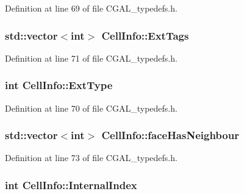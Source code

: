 Definition at line 69 of file C\+G\+A\+L\+\_\+typedefs.\+h.

\hypertarget{struct_cell_info_a152aa36b31e68fb44de2cbe1192cff3e}{}
\subsubsection[{Ext\+Tags}]{\setlength{\rightskip}{0pt plus 5cm}std\+::vector$<$int$>$ Cell\+Info\+::\+Ext\+Tags}\label{struct_cell_info_a152aa36b31e68fb44de2cbe1192cff3e}


Definition at line 71 of file C\+G\+A\+L\+\_\+typedefs.\+h.

\hypertarget{struct_cell_info_a311c40e7871836b77267349a2c9fadc9}{}
\subsubsection[{Ext\+Type}]{\setlength{\rightskip}{0pt plus 5cm}int Cell\+Info\+::\+Ext\+Type}\label{struct_cell_info_a311c40e7871836b77267349a2c9fadc9}


Definition at line 70 of file C\+G\+A\+L\+\_\+typedefs.\+h.

\hypertarget{struct_cell_info_af5ee3a430a357a5680fed55e446519e3}{}
\subsubsection[{face\+Has\+Neighbour}]{\setlength{\rightskip}{0pt plus 5cm}std\+::vector$<$int$>$ Cell\+Info\+::face\+Has\+Neighbour}\label{struct_cell_info_af5ee3a430a357a5680fed55e446519e3}


Definition at line 73 of file C\+G\+A\+L\+\_\+typedefs.\+h.

\hypertarget{struct_cell_info_a23bf3cffc47b6430e60c5263022b684b}{}
\subsubsection[{Internal\+Index}]{\setlength{\rightskip}{0pt plus 5cm}int Cell\+Info\+::\+Internal\+Index}\label{struct_cell_info_a23bf3cffc47b6430e60c5263022b684b}


